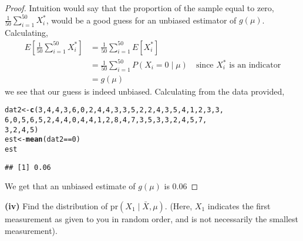 \documentclass[letterpaper, 12pt]{article}\usepackage[]{graphicx}\usepackage[]{color}
\makeatletter
\newcommand{\hlnum}[1]{\textcolor[rgb]{0.686,0.059,0.569}{#1}}%
\newcommand{\hlopt}[1]{\textcolor[rgb]{0,0,0}{#1}}%
\newcommand{\hlstd}[1]{\textcolor[rgb]{0.345,0.345,0.345}{#1}}%
\newcommand{\hlkwb}[1]{\textcolor[rgb]{0.69,0.353,0.396}{#1}}%
\newcommand{\hlkwd}[1]{\textcolor[rgb]{0.737,0.353,0.396}{\textbf{#1}}}%
\newenvironment{kframe}{%
 \def\at@end@of@kframe{}%
 \ifinner\ifhmode%
  \def\at@end@of@kframe{\end{minipage}}%
  \begin{minipage}{\columnwidth}%
 \fi\fi%
 \def\FrameCommand##1{\hskip\@totalleftmargin \hskip-\fboxsep
 \colorbox{shadecolor}{##1}\hskip-\fboxsep
     \hskip-\linewidth \hskip-\@totalleftmargin \hskip\columnwidth}%
 \MakeFramed {\advance\hsize-\width
   \@totalleftmargin\z@ \linewidth\hsize
   \@setminipage}}%
 {\par\unskip\endMakeFramed%
 \at@end@of@kframe}
\newenvironment{knitrout}{}{} %
\newcommand{\pr}{\text{pr}}
\newcommand{\sbs}{\;|\;} %
\makeatother
\begin{document}
\begin{proof}
Intuition would say that the proportion of the sample equal to zero, $\frac{1}{50} \sum_{i=1}^{50} X_i^*$, would be a good guess for an unbiased estimator of $g(\mu)$. Calculating,
\begin{align*}
E\left[  \frac{1}{50} \sum_{i=1}^{50} X_i^* \right] 
&= \frac{1}{50} \sum_{i=1}^{50} E[X_i^*] \\
&= \frac{1}{50} \sum_{i=1}^{50} P (X_i = 0 \sbs \mu)
\quad \text{since $X_i^*$ is an indicator}  \\
&= g(\mu)
\end{align*}
we see that our guess is indeed unbiased.
Calculating from the data provided, 


\begin{knitrout}
\color{fgcolor}\begin{kframe}
\begin{alltt}
\hlstd{dat2} \hlkwb{<-} \hlkwd{c}\hlstd{(}\hlnum{3}\hlstd{,} \hlnum{4}\hlstd{,} \hlnum{4}\hlstd{,} \hlnum{3}\hlstd{,} \hlnum{6}\hlstd{,} \hlnum{0}\hlstd{,} \hlnum{2}\hlstd{,} \hlnum{4}\hlstd{,} \hlnum{4}\hlstd{,} \hlnum{3}\hlstd{,} \hlnum{3}\hlstd{,} \hlnum{5}\hlstd{,} \hlnum{2}\hlstd{,} \hlnum{2}\hlstd{,} \hlnum{4}\hlstd{,} \hlnum{3}\hlstd{,} \hlnum{5}\hlstd{,} \hlnum{4}\hlstd{,} \hlnum{1}\hlstd{,} \hlnum{2}\hlstd{,} \hlnum{3}\hlstd{,} \hlnum{3}\hlstd{,}
    \hlnum{6}\hlstd{,} \hlnum{0}\hlstd{,} \hlnum{5}\hlstd{,} \hlnum{6}\hlstd{,} \hlnum{5}\hlstd{,} \hlnum{2}\hlstd{,} \hlnum{4}\hlstd{,} \hlnum{4}\hlstd{,} \hlnum{0}\hlstd{,} \hlnum{4}\hlstd{,} \hlnum{4}\hlstd{,} \hlnum{1}\hlstd{,} \hlnum{2}\hlstd{,} \hlnum{8}\hlstd{,} \hlnum{4}\hlstd{,} \hlnum{7}\hlstd{,} \hlnum{3}\hlstd{,} \hlnum{5}\hlstd{,} \hlnum{3}\hlstd{,} \hlnum{3}\hlstd{,} \hlnum{2}\hlstd{,} \hlnum{4}\hlstd{,} \hlnum{5}\hlstd{,} \hlnum{7}\hlstd{,}
    \hlnum{3}\hlstd{,} \hlnum{2}\hlstd{,} \hlnum{4}\hlstd{,} \hlnum{5}\hlstd{)}
\hlstd{est} \hlkwb{<-} \hlkwd{mean}\hlstd{(dat2} \hlopt{==} \hlnum{0}\hlstd{)}
\hlstd{est}
\end{alltt}
\begin{verbatim}
## [1] 0.06
\end{verbatim}
\end{kframe}
\end{knitrout}


We get that an unbiased estimate of $g(\mu)$ is 0.06
\end{proof}

\textbf{(iv)}
Find the distribution of $\pr(X_1 \sbs \bar{X}, \mu)$. (Here, $X_1$ indicates the first measurement as given to you in random order, and is not necessarily the smallest measurement).
\end{document}
